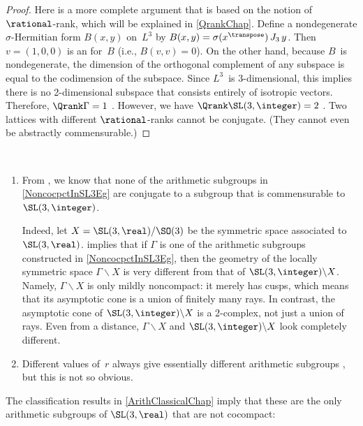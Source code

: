 \begin{proof}
Here is a more complete argument that is based on the notion of $\rational$-rank, which will be explained in \cref{QrankChap}.
 Define a nondegenerate $\sigma$-Hermitian form $B(x,y)$
on~$L^3$ by $B(x,y) = \sigma(x^\transpose) \, J_3 \, y$.
Then $v = (1,0,0)$ is an  for~$B$ (i.e., $B(v,v) = 0$). On the other
hand, because $B$~is nondegenerate, the dimension of the orthogonal complement
of any subspace is equal to the codimension of the subspace.
Since $L^3$~is $3$-dimensional, this implies there is no 2-dimensional subspace that consists entirely of isotropic vectors. Therefore, $\Qrank \Gamma = 1$ . However, we have $\Qrank \SL(3,\integer) = 2$ . Two lattices with different $\rational$-ranks cannot be conjugate. (They cannot even be abstractly commensurable.)
 \end{proof}

\begin{rems} \ 
\noprelistbreak
 \begin{enumerate}
 \item From 
, we know that none
of the arithmetic subgroups in \cref{NoncocpctInSL3Eg} are
conjugate to a subgroup that is commensurable to
$\SL(3,\integer)$. 

Indeed, let $X = \SL(3,\real)/\SO(3)$ be the symmetric space
associated to $\SL(3,\real)$. 
implies that if $\Gamma$ is one of the arithmetic subgroups constructed
in \cref{NoncocpctInSL3Eg}, then the geometry of the
locally symmetric space $\Gamma \backslash X$ is very
different from that of $\SL(3,\integer) \backslash X$.
Namely, $\Gamma \backslash X$ is only mildly noncompact: it
merely has cusps, which means that its asymptotic cone is a
union of finitely many rays. In contrast, the asymptotic cone
of $\SL(3,\integer) \backslash X$ is a
2-complex, not just a union of rays. Even from a distance,
$\Gamma \backslash X$ and $\SL(3,\integer) \backslash X$
look completely different.

\item Different values of~$r$ always give essentially
different arithmetic subgroups , but this is
not so obvious.
 \end{enumerate}
 \end{rems}

The classification results in
\cref{ArithClassicalChap} imply that these are the
only arithmetic subgroups of $\SL(3,\real)$ that are not cocompact:

